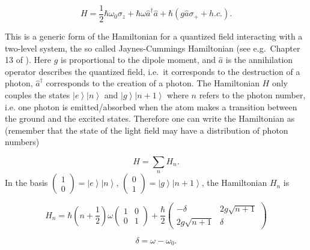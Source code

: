 \documentclass[12pt]{iopart}
\begin{document}
\begin{equation}
H=\frac{1}{2}\hbar\omega_{0}\sigma_{z}+\hbar\omega\hat{a}^{\dagger}
\hat{a}+\hbar\left(g\hat{a}\sigma_{+}+h.c.\right).\label{eq:53}
\end{equation}

\noindent This is a generic form of the Hamiltonian for a quantized field interacting with a two-level system, the so called Jaynes-Cummings Hamiltonian (see e.g.\ Chapter 13 of \cite{Meystre91}). Here $g$ is proportional to the dipole moment, and $\hat{a}$ is the annihilation operator describes the quantized field, i.e.\ it corresponds to the destruction of a photon, $\hat{a}^\dagger$ corresponds to the creation of a photon. The Hamiltonian $H$ only couples the states $\left|e\right\rangle \left|n\right\rangle $ and $\left|g\right\rangle \left|n+1\right\rangle $ where $n$ refers to the photon number, i.e. one photon is emitted/absorbed when the atom makes a transition between the ground and the excited states. Therefore one can write the Hamiltonian as (remember that the state of the light field may have a distribution of photon numbers)

\begin{equation}
H=\sum_{n}H_{n}.\label{eq:57}\end{equation}
In the basis $\left(\begin{array}{c}
1\\
0\end{array}\right)=\left|e\right\rangle \left|n\right\rangle $, $\left(\begin{array}{c}
0\\
1\end{array}\right)=\left|g\right\rangle \left|n+1\right\rangle $, the Hamiltonian $H_{n}$ is

\begin{equation}
H_{n}=\hbar\left(n+\frac{1}{2}\right)\omega\left(\begin{array}{cc}
1 & 0\\
0 & 1\end{array}\right)+\frac{\hbar}{2}\left(\begin{array}{cc}
-\delta & 2g\sqrt{n+1}\\
2g\sqrt{n+1} & \delta\end{array}\right)\label{eq_L6:58}\end{equation}


\begin{equation}
\delta=\omega-\omega_{0}.\label{eq_L6:59}\end{equation}
\end{document}
